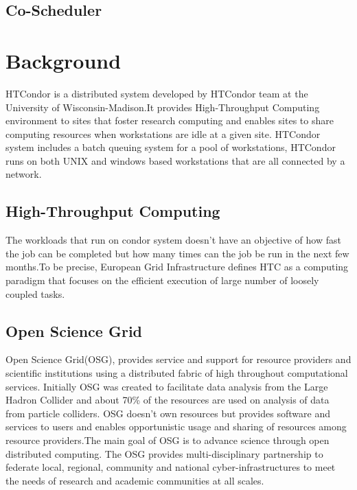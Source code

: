 \documentclass[ms,electronic,double]{nuthesis}
\begin{document}
\section{Co-Scheduler}


\chapter{Background}
HTCondor is a distributed system developed by HTCondor team at the University of 
Wisconsin-Madison.It provides High-Throughput Computing environment to sites 
that foster research computing and enables sites to share computing resources when 
workstations are idle at a given site. HTCondor system includes a batch queuing 
system for a pool of workstations, HTCondor runs on both UNIX and windows based 
workstations that are all connected by a network. 

\section{High-Throughput Computing} The workloads that run on 
condor system doesn't have an objective of  how fast the job can be completed but how many 
times can the job be run in the next few months.To be precise, European Grid 
Infrastructure defines HTC as a computing paradigm that focuses on the efficient 
execution of large number of loosely coupled tasks.

\section{Open Science Grid} Open Science Grid(OSG), provides service and support 
for resource providers and scientific institutions using a distributed fabric of 
high throughout computational services. Initially OSG was created to facilitate data analysis from the 
Large Hadron Collider and about 70\% of the resources are used on analysis of data from particle colliders.
OSG doesn't own resources but provides software and services to users and enables opportunistic usage and  sharing of resources among
resource providers.The main goal of OSG is to advance science through open 
distributed computing. The OSG provides multi-disciplinary partnership to federate 
local, regional, community and national cyber-infrastructures to meet the needs 
of research and academic communities at all scales. 



\backmatter

\appendix




\nocite{*}

\end{document}
